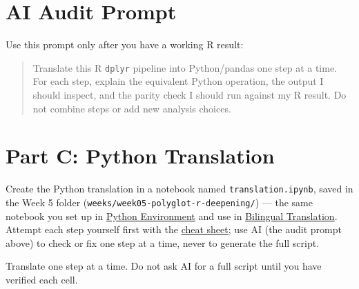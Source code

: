 \documentclass[
  letterpaper,
  DIV=11,
  numbers=noendperiod,
  oneside]{scrreprt}
\begin{document}
\section{AI Audit Prompt}\label{ai-audit-prompt}

Use this prompt only after you have a working R result:

\begin{quote}
Translate this R \texttt{dplyr} pipeline into Python/pandas one step at
a time. For each step, explain the equivalent Python operation, the
output I should inspect, and the parity check I should run against my R
result. Do not combine steps or add new analysis choices.
\end{quote}

\section{Part C: Python Translation}\label{part-c-python-translation}

Create the Python translation in a notebook named
\texttt{translation.ipynb}, saved in the Week 5 folder
(\texttt{weeks/week05-polyglot-r-deepening/}) --- the same notebook you
set up in \href{python02-environment.qmd}{Python Environment} and use in
\href{python13-translation-exercise.qmd}{Bilingual Translation}. Attempt
each step yourself first with the \href{python14-cheat-sheet.qmd}{cheat
sheet}; use AI (the audit prompt above) to check or fix one step at a
time, never to generate the full script.

Translate one step at a time. Do not ask AI for a full script until you
have verified each cell.
\end{document}

